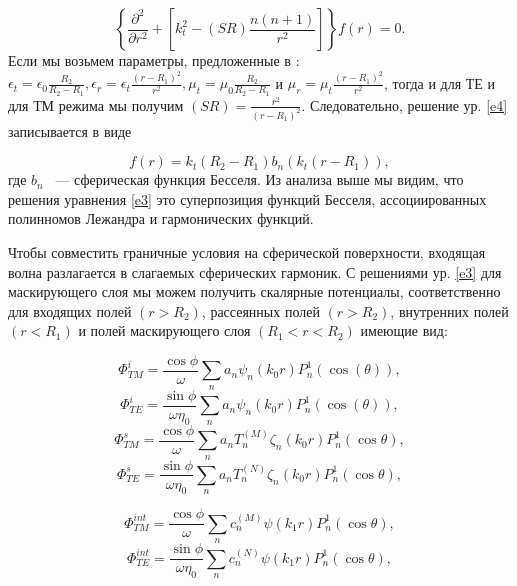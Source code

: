\documentclass[a4paper, 12pt]{article}
\begin{document}
\begin{equation}\label{e4}
	\left\{\frac{\partial^2}{\partial r^2} + 
\left[k^2_t-(SR)\frac{n(n+1)}{r^2}\right]
	\right\}f(r) = 0.
\end{equation}
Если мы возьмем параметры, предложенные в \cite{4}: 
$\epsilon_t = \epsilon_0 \frac{R_2}{R_2-R_1}, 
\epsilon_r=\epsilon_t \frac{(r-R_1)^2}{r^2}, \mu_t = \mu_0 \frac{R_2}{R_2-R_1}$ и
$\mu_r = \mu_t \frac{(r-R_1)^2}{r^2}$, тогда и для ТЕ и для ТМ режима мы получим
$(SR)=\frac{r^2}{(r-R_1)^2}$.
Следовательно, решение ур. \eqref{e4} записывается в виде

\begin{equation}\label{e5}
	f(r) = k_t(R_2-R_1)b_n(k_t(r-R_1)),	
\end{equation}
где $b_n$ ~--- сферическая функция Бесселя. Из анализа выше мы видим, что решения
уравнения \eqref{e3} это суперпозиция функций Бесселя, ассоциированных полинномов 
Лежандра и гармонических функций.

Чтобы совместить граничные условия на сферической поверхности, входящая волна
разлагается в слагаемых сферических гармоник. С решениями ур. \eqref{e3} 
для маскирующего слоя мы можем получить скалярные потенциалы, соответственно
для входящих полей $(r>R_2)$, рассеянных полей $(r>R_2)$, внутренних полей
$(r<R_1)$ и полей маскирующего слоя $(R_1<r<R_2)$ имеющие вид:

\begin{equation*}
\Phi_{TM}^i = \frac{\cos\phi}{\omega}\sum_n{a_n\psi_n(k_0r)P_n^1(\cos(\theta))},
\end{equation*}
\begin{equation}\label{e6}
\Phi_{TE}^i = \frac{\sin\phi}{\omega\eta_0}\sum_n{a_n\psi_n(k_0r)P_n^1(\cos(\theta))},
\end{equation}
\vspace{1cm}
\begin{equation*}
	\Phi_{TM}^s = \frac{\cos\phi}{\omega}\sum_n{a_nT_n^{(M)}\zeta_n(k_0r)P_n^1(\cos\theta)},
\end{equation*}
\begin{equation}\label{e7}
	\Phi_{TE}^s = \frac{\sin\phi}{\omega\eta_0}\sum_n{a_nT_n^{(N)}\zeta_n(k_0r)P_n^1(\cos\theta)},
\end{equation}

\vspace{1cm}

\begin{equation*}
	\Phi_{TM}^{int} = \frac{\cos\phi}{\omega}\sum_n{c_n^{(M)}\psi(k_1r)P_n^1(\cos\theta)},
\end{equation*}
\begin{equation}\label{e8}
	\Phi_{TE}^{int} = \frac{\sin\phi}{\omega\eta_0}\sum_n{c_n^{(N)}\psi(k_1r)P_n^1(\cos\theta)},
\end{equation}
\end{document}
